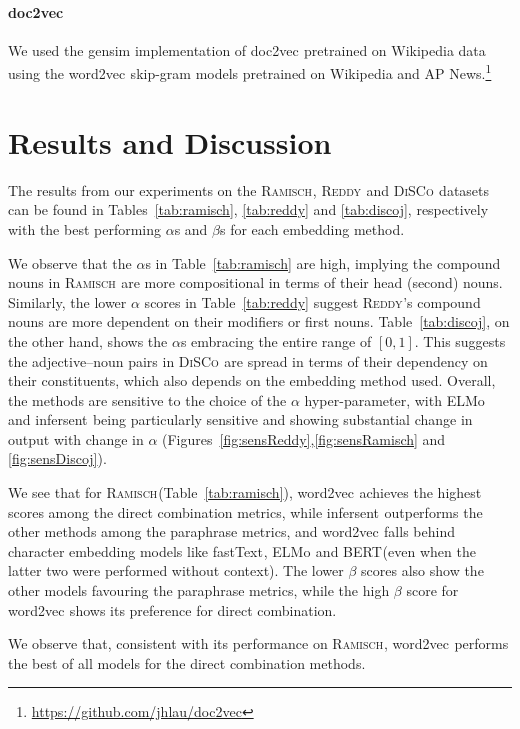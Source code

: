 \documentclass[11pt,a4paper]{article}
\newcommand{\embmethod}[2][]{\textsf{#2}$_{\text{#1}}$\xspace}
\newcommand{\wordtovec}{\embmethod{word2vec}}
\newcommand{\infersent}[1][]{\embmethod[#1]{infersent}}
\newcommand{\doctovec}{\embmethod{doc2vec}}
\newcommand{\elmo}{\embmethod{ELMo}}
\newcommand{\fasttext}{\embmethod{fastText}}
\newcommand{\bert}{\embmethod{BERT}}
\newcommand{\dataset}[2][]{\textsc{#2}$_{\text{#1}}$\xspace}
\newcommand{\reddy}{\dataset{Reddy}}
\newcommand{\ramisch}{\dataset{Ramisch}}
\newcommand{\discoj}[1][]{\dataset[#1]{DiSCo}}
\newcommand{\tabref}[2][]{Table#1~\ref{#2}\xspace}
\newcommand{\figref}[2][]{Figure#1~\ref{#2}\xspace}
\begin{document}
\paragraph{\doctovec}
We used the gensim implementation of \doctovec \cite{Le+:2014,Lau:Baldwin:2016b} pretrained on Wikipedia data using the \wordtovec skip-gram models pretrained on Wikipedia and AP News.\footnote{\url{https://github.com/jhlau/doc2vec}}



\section{Results and Discussion}
\label{ssec:accessibility}

The results from our experiments on the \ramisch, \reddy and \discoj datasets can be found in \tabref[s]{tab:ramisch}, \ref{tab:reddy} and \ref{tab:discoj}, respectively with the best performing $\alpha$s and $\beta$s for each embedding method.

We observe that the $\alpha$s in \tabref{tab:ramisch} are high, implying the compound nouns in \ramisch are more compositional in terms of their head (second) nouns. Similarly, the lower $\alpha$ scores in \tabref{tab:reddy} suggest \reddy's compound nouns are more dependent on their modifiers or first nouns. \tabref{tab:discoj}, on the other hand, shows the $\alpha$s embracing the entire range of $[0,1]$. This suggests the adjective--noun pairs in \discoj are spread in terms of their dependency on their constituents, which also depends on the embedding method used. Overall, the methods are sensitive to the choice of the $\alpha$ hyper-parameter, with \elmo and \infersent being particularly sensitive and showing substantial change in output with change in $\alpha$ (\figref[s]{fig:sensReddy},\ref{fig:sensRamisch} and \ref{fig:sensDiscoj}).

We see that for \ramisch (\tabref{tab:ramisch}), \wordtovec achieves the highest scores among the direct combination metrics, while \infersent outperforms the other methods among the paraphrase metrics, and \wordtovec falls behind character embedding models like \fasttext, \elmo and \bert (even when the latter two were performed without context). The lower $\beta$ scores also show the other models favouring the paraphrase metrics, while the high $\beta$ score for \wordtovec shows its preference for direct combination.

We observe that, consistent with its performance on \ramisch, \wordtovec performs the best of all models for the direct combination methods.
\end{document}
